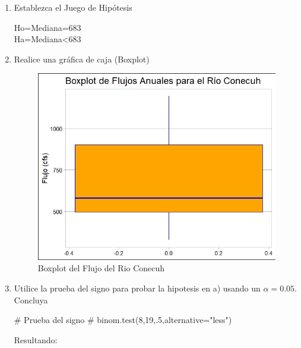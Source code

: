 \documentclass[a4paper,12pt]{article} %
\begin{document}
\begin{enumerate} [label=\textbf{\alph*})]
			\item {Establezca el Juego de Hipótesis} 
			\begin{center}
				Ho=Mediana=683\\
				Ha=Mediana<683
			\end{center}
			
			\item {Realice una gráfica de caja (Boxplot)} 
			
			
\begin{figure}[H]
	\centering
	\includegraphics[width=0.7\linewidth]{Box_1}
	\captionsetup{labelfont=bf}
	\caption[Boxplot del Flujo del Rio Conecuh]{Boxplot del Flujo del Rio Conecuh}
	\label{fig:box1}
\end{figure}
			\item {Utilice la prueba del signo para probar la hipotesis en a) usando un \( \alpha = 0.05 \). Concluya }
			
			\begin{MyVerbatim}
# Prueba del signo #
binom.test(8,19,.5,alternative="less")
			\end{MyVerbatim}
			Resultando:
			
			\begin{MyVerbatim}
			

\end{MyVerbatim}
\end{enumerate}
\end{document}
